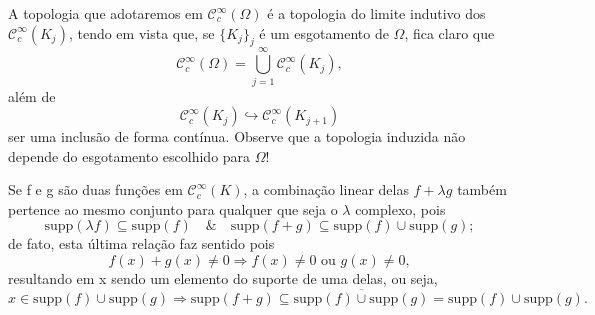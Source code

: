 \documentclass[../distribution_theory_notes.tex]{subfiles}
\begin{document}
A topologia que adotaremos em \(\mathcal{C}_{c}^{\infty}(\Omega )\) é a topologia do limite indutivo dos \(\mathcal{C}_{c}^{\infty}(K_{j})\), tendo em vista que, se \(\{K_{j}\}_{j}\) é um esgotamento de \(\Omega \), fica claro que
\[
	\mathcal{C}_{c}^{\infty}(\Omega )=\bigcup_{j=1}^{\infty}\mathcal{C}_{c}^{\infty}(K_{j}),
\]
além de
\[
	\mathcal{C}_{c}^{\infty}(K_{j})\hookrightarrow \mathcal{C}_{c}^{\infty}(K_{j+1})
\]
ser uma inclusão de forma contínua. Observe que a topologia induzida não depende do esgotamento escolhido para \(\Omega \)!
\begin{tcolorbox}[
		skin=enhanced,
		title=Observação,
		fonttitle=\bfseries,
		colframe=black,
		colbacktitle=cyan!75!white,
		colback=cyan!15,
		colbacklower=black,
		coltitle=black,
		drop fuzzy shadow,
	]
	Se f e g são duas funções em \(\mathcal{C}_{c}^{\infty}(K)\), a combinação linear delas \(f+\lambda g\) também pertence ao mesmo conjunto para qualquer que seja o \(\lambda \) complexo, pois
	\[
		\mathrm{supp}(\lambda f)\subseteq \mathrm{supp}(f)\quad\&\quad \mathrm{supp}(f+g)\subseteq \mathrm{supp}(f)\cup \mathrm{supp}(g);
	\]
	de fato, esta última relação faz sentido pois
	\[
		f(x)+g(x)\neq 0 \Rightarrow f(x)\neq 0 \text{ ou }g(x)\neq 0,
	\]
	resultando em x sendo um elemento do suporte de uma delas, ou seja,
	\[
		x\in \mathrm{supp}(f)\cup \mathrm{supp}(g)\Rightarrow \mathrm{supp}(f+g)\subseteq \overline{\mathrm{supp}(f)\cup \mathrm{supp}(g)}=\mathrm{supp}(f)\cup \mathrm{supp}(g).
	\]
\end{tcolorbox}
\end{document}
